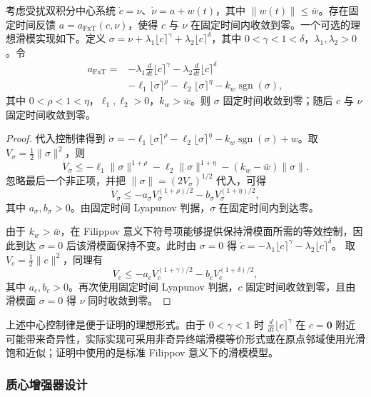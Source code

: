 \begin{lemma}[鲁棒固定时间中心控制]
考虑受扰双积分中心系统 $\dot c=\nu$、$\dot\nu=a+w(t)$，其中 $\|w(t)\|\leq\bar w$。存在固定时间反馈 $a=a_{\mathrm{FxT}}(c,\nu)$，使得 $c$ 与 $\nu$ 在固定时间内收敛到零。一个可选的理想滑模实现如下。定义 $\sigma=\nu+\lambda_1\lfloor c\rceil^{\gamma}+\lambda_2\lfloor c\rceil^{\delta}$，其中 $0<\gamma<1<\delta$，$\lambda_1,\lambda_2>0$。令
$$
\begin{aligned}
a_{\mathrm{FxT}}
={}&-\lambda_1\frac{d}{dt}\lfloor c\rceil^\gamma
-\lambda_2\frac{d}{dt}\lfloor c\rceil^\delta\\
&-\ell_1\lfloor\sigma\rceil^{\rho}
-\ell_2\lfloor\sigma\rceil^{\eta}
-k_w\operatorname{sgn}(\sigma),
\end{aligned}
$$
其中 $0<\rho<1<\eta$，$\ell_1,\ell_2>0$，$k_w>\bar w$。则 $\sigma$ 固定时间收敛到零；随后 $c$ 与 $\nu$ 固定时间收敛到零。
\end{lemma}

\begin{proof}
代入控制律得到 $\dot\sigma=-\ell_1\lfloor\sigma\rceil^{\rho}-\ell_2\lfloor\sigma\rceil^{\eta}-k_w\operatorname{sgn}(\sigma)+w$。取 $V_\sigma=\frac{1}{2}\|\sigma\|^2$，则
$$
\dot V_\sigma
\leq
-\ell_1\|\sigma\|^{1+\rho}
-\ell_2\|\sigma\|^{1+\eta}
-(k_w-\bar w)\|\sigma\|.
$$
忽略最后一个非正项，并把 $\|\sigma\|=(2V_\sigma)^{1/2}$ 代入，可得
$$
\dot V_\sigma
\leq
-a_\sigma V_\sigma^{(1+\rho)/2}
-b_\sigma V_\sigma^{(1+\eta)/2},
$$
其中 $a_\sigma,b_\sigma>0$。由固定时间 Lyapunov 判据，$\sigma$ 在固定时间内到达零。

由于 $k_w>\bar w$，在 Filippov 意义下符号项能够提供保持滑模面所需的等效控制，因此到达 $\sigma=0$ 后该滑模面保持不变。此时由 $\sigma=0$ 得 $\dot c=-\lambda_1\lfloor c\rceil^\gamma-\lambda_2\lfloor c\rceil^\delta$。
取 $V_c=\frac{1}{2}\|c\|^2$，同理有
$$
\dot V_c
\leq
-a_c V_c^{(1+\gamma)/2}
-b_c V_c^{(1+\delta)/2},
$$
其中 $a_c,b_c>0$。再次使用固定时间 Lyapunov 判据，$c$ 固定时间收敛到零，且由滑模面 $\sigma=0$ 得 $\nu$ 同时收敛到零。
\end{proof}

\begin{remark}
上述中心控制律是便于证明的理想形式。由于 $0<\gamma<1$ 时 $\frac{d}{dt}\lfloor c\rceil^\gamma$ 在 $c=\mathbf{0}$ 附近可能带来奇异性，实际实现可采用非奇异终端滑模等价形式或在原点邻域使用光滑饱和近似；证明中使用的是标准 Filippov 意义下的滑模模型。
\end{remark}

\subsubsection{质心增强器设计}

